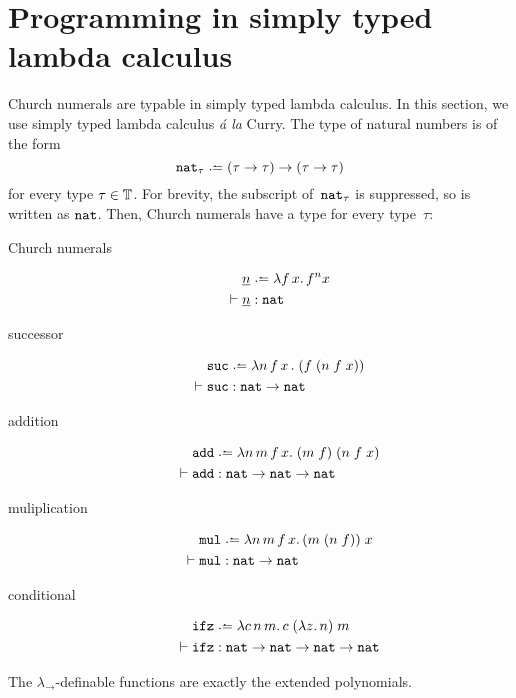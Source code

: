 \section{Programming in simply typed lambda calculus}
Church numerals are typable in simply typed lambda calculus.
In this section, we use simply typed lambda calculus \emph{\'a la} Curry.
The type of natural numbers is of the form
\[
  \nat_\tau \defeq (\tau \to \tau) \to (\tau \to \tau) 
\]
for every type $\tau \in \mathbb{T}$. For brevity, the subscript of~$\mathtt{nat}_\tau$ is
suppressed, so is written as $\mathtt{nat}$. Then, Church numerals have a type for every
type~$\tau$:
  \begin{description}
    \item[Church numerals]
      \begin{align*}
        & \underline{n} \defeq \lambda f\,x.\,
        f^n x \\
        \vdash{} & \underline{n} : \nat
      \end{align*}
    \item[successor]
      \begin{align*}
        & \suc \defeq \lambda n \,f\,x\,.\;(f\;(n\;f\;x)) \\
        \vdash{} & \suc : \nat \to \nat
      \end{align*}
    \item[addition]
      \begin{align*}
        & \add \defeq \lambda n\,m\,f\,x.\; (m\;f)\;(n\;f\;x) \\
        \vdash{} & \add : \nat \to \nat \to \nat
      \end{align*}
    \item[muliplication] 
      \begin{align*}
        & \mul \defeq \lambda n\,m\,f\,x.\, (m\;(n\;f))\;x\\
      \vdash{} & \mul : \nat \to \nat
      \end{align*}
    \item[conditional]
      \begin{align*}
        & \ifz \defeq \lambda c\,n\,m.\, c\;(\lambda z.\, n)\;m\\
        \vdash {} & \ifz : \nat \to \nat \to \nat \to \nat
      \end{align*}
  \end{description}
\begin{theorem}[Schwichtenberg]
  The $\lambda_\to$-definable functions are exactly
  the extended polynomials.
\end{theorem}
